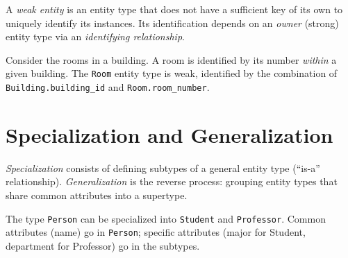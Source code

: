\begin{definition}
A \emph{weak entity} is an entity type that does not have a sufficient key
of its own to uniquely identify its instances. Its identification depends
on an \emph{owner} (strong) entity type via an \emph{identifying relationship}.
\end{definition}

\begin{example}
Consider the rooms in a building. A room is identified by its number
\emph{within} a given building. The \texttt{Room} entity type is weak,
identified by the combination of \texttt{Building.building\_id} and
\texttt{Room.room\_number}.
\end{example}

\begin{center}
\end{center}

\section{Specialization and Generalization}

\begin{definition}
\emph{Specialization} consists of defining subtypes of a general entity type
(``is-a'' relationship). \emph{Generalization} is the reverse process:
grouping entity types that share common attributes into a supertype.
\end{definition}

\begin{example}
The type \texttt{Person} can be specialized into \texttt{Student} and
\texttt{Professor}. Common attributes (name) go in \texttt{Person};
specific attributes (major for Student, department for Professor) go in
the subtypes.
\end{example}

